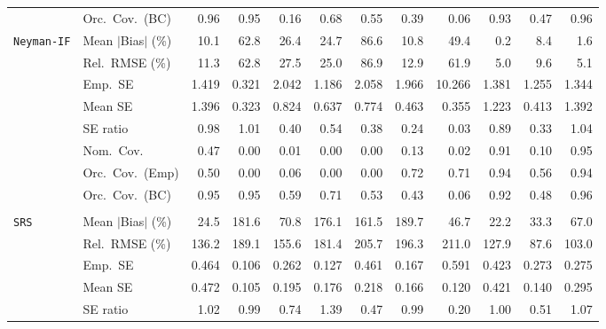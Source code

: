 \begin{landscape}
\begin{longtable}{llrrrrrrrrrr}
 & Orc.\ Cov.\ (BC) & \cellcolor{ranktwo}0.96 & \cellcolor{rankone}0.95 & 0.16 & 0.68 & 0.55 & 0.39 & 0.06 & \cellcolor{rankthree}0.93 & 0.47 & \cellcolor{ranktwo}0.96 \\
\addlinespace[2pt]
\quad \texttt{Neyman-IF} & Mean $|$Bias$|$ (\%) & 10.1 & 62.8 & 26.4 & 24.7 & 86.6 & 10.8 & 49.4 & \cellcolor{rankone}0.2 & \cellcolor{rankthree}8.4 & \cellcolor{ranktwo}1.6 \\
 & Rel.\ RMSE (\%) & 11.3 & 62.8 & 27.5 & 25.0 & 86.9 & 12.9 & 61.9 & \cellcolor{rankone}5.0 & \cellcolor{rankthree}9.6 & \cellcolor{ranktwo}5.1 \\
 & Emp.\ SE & 1.419 & 0.321 & 2.042 & 1.186 & 2.058 & 1.966 & 10.266 & 1.381 & 1.255 & 1.344 \\
 & Mean SE & 1.396 & 0.323 & 0.824 & 0.637 & 0.774 & 0.463 & 0.355 & 1.223 & 0.413 & 1.392 \\
 & SE ratio & \cellcolor{ranktwo}0.98 & \cellcolor{rankone}1.01 & 0.40 & 0.54 & 0.38 & 0.24 & 0.03 & 0.89 & 0.33 & \cellcolor{rankthree}1.04 \\
 & Nom.\ Cov. & \cellcolor{rankthree}0.47 & 0.00 & 0.01 & 0.00 & 0.00 & 0.13 & 0.02 & \cellcolor{ranktwo}0.91 & 0.10 & \cellcolor{rankone}0.95 \\
 & Orc.\ Cov.\ (Emp) & 0.50 & 0.00 & 0.06 & 0.00 & 0.00 & \cellcolor{ranktwo}0.72 & \cellcolor{rankthree}0.71 & \cellcolor{rankone}0.94 & 0.56 & \cellcolor{rankone}0.94 \\
 & Orc.\ Cov.\ (BC) & \cellcolor{rankone}0.95 & \cellcolor{rankone}0.95 & 0.59 & 0.71 & 0.53 & 0.43 & 0.06 & \cellcolor{rankthree}0.92 & 0.48 & \cellcolor{ranktwo}0.96 \\
\addlinespace[2pt]
\multicolumn{12}{l}{\textbf{Continuous Phase-One Covariates}} \\
\addlinespace[2pt]
\quad \texttt{SRS} & Mean $|$Bias$|$ (\%) & \cellcolor{ranktwo}24.5 & 181.6 & 70.8 & 176.1 & 161.5 & 189.7 & 46.7 & \cellcolor{rankone}22.2 & \cellcolor{rankthree}33.3 & 67.0 \\
 & Rel.\ RMSE (\%) & 136.2 & 189.1 & 155.6 & 181.4 & 205.7 & 196.3 & 211.0 & \cellcolor{rankthree}127.9 & \cellcolor{rankone}87.6 & \cellcolor{ranktwo}103.0 \\
 & Emp.\ SE & 0.464 & 0.106 & 0.262 & 0.127 & 0.461 & 0.167 & 0.591 & 0.423 & 0.273 & 0.275 \\
 & Mean SE & 0.472 & 0.105 & 0.195 & 0.176 & 0.218 & 0.166 & 0.120 & 0.421 & 0.140 & 0.295 \\
 & SE ratio & \cellcolor{rankthree}1.02 & \cellcolor{ranktwo}0.99 & 0.74 & 1.39 & 0.47 & \cellcolor{ranktwo}0.99 & 0.20 & \cellcolor{rankone}1.00 & 0.51 & 1.07 \\

\end{longtable}
\end{landscape}

